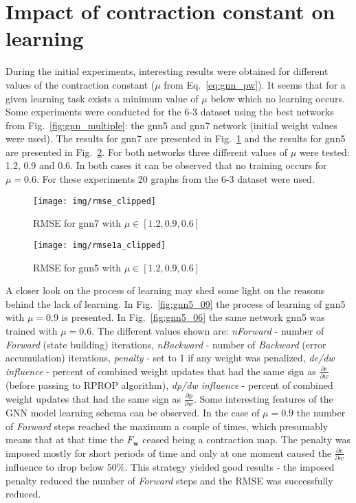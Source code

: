 \section{Impact of contraction constant on learning~\label{sec:contraction_constant}}
During the initial experiments, interesting results were obtained for different values of the contraction constant ($\mu$ from Eq.~\ref{eq:gnn_pw}). It seems that for a given learning task exists a minimum value of $\mu$ below which no learning occurs. Some experiments were conducted for the 6-3 dataset using the best networks from Fig.~\ref{fig:gnn_multiple}: the gnn5 and gnn7 network (initial weight values were used). The results for gnn7 are presented in Fig.~\ref{fig:gnn7} and the results for gnn5 are presented in Fig.~\ref{fig:gnn5}. For both networks three different values of $\mu$ were tested: 1.2, 0.9 and 0.6. In both cases it can be observed that no training occurs for $\mu = 0.6$. For these experiments 20 graphs from the 6-3 dataset were used.

\begin{figure}[h!]
\begin{center}
	\texttt{[image: img/rmse\_clipped]}
	\caption{RMSE for gnn7 with $\mu \in [1.2, 0.9, 0.6]$}
	\label{fig:gnn7}
\end{center}
\end{figure}

\begin{figure}[h!]
\begin{center}
	\texttt{[image: img/rmse1a\_clipped]}
	\caption{RMSE for gnn5 with $\mu \in [1.2, 0.9, 0.6]$}
	\label{fig:gnn5}
\end{center}
\end{figure}

A closer look on the process of learning may shed some light on the reasons behind the lack of learning. In Fig.~\ref{fig:gnn5_09} the process of learning of gnn5 with $\mu = 0.9$ is presented. In Fig.~\ref{fig:gnn5_06} the same network gnn5 was trained with $\mu = 0.6$. The different values shown are: \emph{nForward} - number of \emph{Forward} (state building) iterations, \emph{nBackward} - number of \emph{Backward} (error accumulation) iterations, \emph{penalty} - set to 1 if any weight was penalized, \emph{de/dw influence} - percent of combined weight updates that had the same sign as $\frac{\partial e}{\partial w}$ (before passing to RPROP algorithm), \emph{dp/dw influence} - percent of combined weight updates that had the same sign as $\frac{\partial p}{\partial w}$. Some interesting features of the GNN model learning schema can be observed. In the case of $\mu = 0.9$ the number of \emph{Forward} steps reached the maximum a couple of times, which presumably means that at that time the $F_{\bm{w}}$ ceased being a contraction map. The penalty was imposed mostly for short periods of time and only at one moment caused the $\frac{\partial e}{\partial w}$ influence to drop below 50\%. This strategy yielded good results - the imposed penalty reduced the number of \emph{Forward} steps and the RMSE was successfully reduced.

